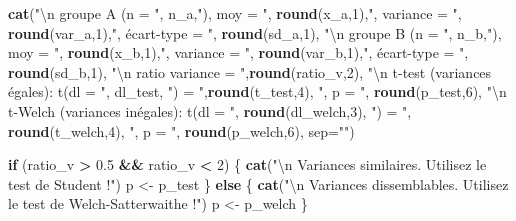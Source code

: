 \documentclass[
  11pt,
  french,
]{book}
\makeatletter
\newenvironment{Shaded}{\begin{snugshade}}{\end{snugshade}}
\newcommand{\CharTok}[1]{\textcolor[rgb]{0.31,0.60,0.02}{#1}}
\newcommand{\ControlFlowTok}[1]{\textcolor[rgb]{0.13,0.29,0.53}{\textbf{#1}}}
\newcommand{\DataTypeTok}[1]{\textcolor[rgb]{0.13,0.29,0.53}{#1}}
\newcommand{\DecValTok}[1]{\textcolor[rgb]{0.00,0.00,0.81}{#1}}
\newcommand{\FloatTok}[1]{\textcolor[rgb]{0.00,0.00,0.81}{#1}}
\newcommand{\KeywordTok}[1]{\textcolor[rgb]{0.13,0.29,0.53}{\textbf{#1}}}
\newcommand{\NormalTok}[1]{#1}
\newcommand{\OperatorTok}[1]{\textcolor[rgb]{0.81,0.36,0.00}{\textbf{#1}}}
\newcommand{\StringTok}[1]{\textcolor[rgb]{0.31,0.60,0.02}{#1}}
\newenvironment{kframe}{%
\medskip{}
\setlength{\fboxsep}{.8em}
 \def\at@end@of@kframe{}%
 \ifinner\ifhmode%
  \def\at@end@of@kframe{\end{minipage}}%
  \begin{minipage}{\columnwidth}%
 \fi\fi%
 \def\FrameCommand##1{\hskip\@totalleftmargin \hskip-\fboxsep
 \colorbox{shadecolor}{##1}\hskip-\fboxsep
     \hskip-\linewidth \hskip-\@totalleftmargin \hskip\columnwidth}%
 \MakeFramed {\advance\hsize-\width
   \@totalleftmargin\z@ \linewidth\hsize
   \@setminipage}}%
 {\par\unskip\endMakeFramed%
 \at@end@of@kframe}
\renewenvironment{Shaded}{\begin{kframe}}{\end{kframe}}
\makeatother
\begin{document}
\begin{Shaded}
\begin{Highlighting}[]
    \KeywordTok{cat}\NormalTok{(}\StringTok{"}\CharTok{\textbackslash{}n}\StringTok{ groupe A (n = "}\NormalTok{, n_a,}\StringTok{"), moy = "}\NormalTok{, }\KeywordTok{round}\NormalTok{(x_a,}\DecValTok{1}\NormalTok{),}\StringTok{", }
\StringTok{           variance = "}\NormalTok{, }\KeywordTok{round}\NormalTok{(var_a,}\DecValTok{1}\NormalTok{),}\StringTok{", écart-type = "}\NormalTok{, }\KeywordTok{round}\NormalTok{(sd_a,}\DecValTok{1}\NormalTok{),}
        \StringTok{"}\CharTok{\textbackslash{}n}\StringTok{ groupe B (n = "}\NormalTok{, n_b,}\StringTok{"), moy = "}\NormalTok{, }\KeywordTok{round}\NormalTok{(x_b,}\DecValTok{1}\NormalTok{),}\StringTok{", }
\StringTok{          variance = "}\NormalTok{, }\KeywordTok{round}\NormalTok{(var_b,}\DecValTok{1}\NormalTok{),}\StringTok{", écart-type = "}\NormalTok{, }\KeywordTok{round}\NormalTok{(sd_b,}\DecValTok{1}\NormalTok{),}
        \StringTok{"}\CharTok{\textbackslash{}n}\StringTok{ ratio variance = "}\NormalTok{,}\KeywordTok{round}\NormalTok{(ratio_v,}\DecValTok{2}\NormalTok{),}
        \StringTok{"}\CharTok{\textbackslash{}n}\StringTok{ t-test (variances égales): t(dl = "}\NormalTok{, dl_test, }\StringTok{") = "}\NormalTok{,}\KeywordTok{round}\NormalTok{(t_test,}\DecValTok{4}\NormalTok{),}
         \StringTok{", p = "}\NormalTok{, }\KeywordTok{round}\NormalTok{(p_test,}\DecValTok{6}\NormalTok{),}
         \StringTok{"}\CharTok{\textbackslash{}n}\StringTok{ t-Welch (variances inégales): t(dl = "}\NormalTok{, }\KeywordTok{round}\NormalTok{(dl_welch,}\DecValTok{3}\NormalTok{), }\StringTok{") = "}\NormalTok{,}
        \KeywordTok{round}\NormalTok{(t_welch,}\DecValTok{4}\NormalTok{), }\StringTok{", p = "}\NormalTok{, }\KeywordTok{round}\NormalTok{(p_welch,}\DecValTok{6}\NormalTok{),  }\DataTypeTok{sep=}\StringTok{""}\NormalTok{)    }
  
    \ControlFlowTok{if}\NormalTok{ (ratio_v }\OperatorTok{>}\StringTok{ }\FloatTok{0.5} \OperatorTok{&&}\StringTok{ }\NormalTok{ratio_v }\OperatorTok{<}\StringTok{ }\DecValTok{2}\NormalTok{)  \{}
      \KeywordTok{cat}\NormalTok{(}\StringTok{"}\CharTok{\textbackslash{}n}\StringTok{ Variances similaires. Utilisez le test de Student !"}\NormalTok{)}
\NormalTok{      p <-}\StringTok{ }\NormalTok{p_test}
\NormalTok{    \} }\ControlFlowTok{else}\NormalTok{ \{}
      \KeywordTok{cat}\NormalTok{(}\StringTok{"}\CharTok{\textbackslash{}n}\StringTok{ Variances dissemblables. Utilisez le test de Welch-Satterwaithe !"}\NormalTok{)}
\NormalTok{      p <-}\StringTok{ }\NormalTok{p_welch}
\NormalTok{    \}}
    

\end{Highlighting}
\end{Shaded}
\end{document}
